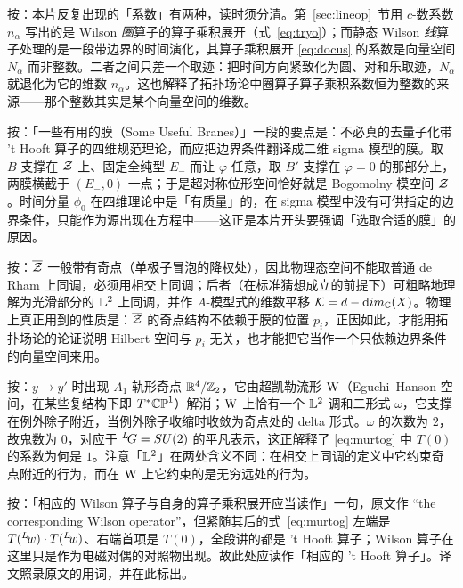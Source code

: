 \begin{yizhu}[易错点]
按：本片反复出现的「系数」有两种，读时须分清。第~\ref{sec:lineop}~节用 $c$-数系数 $n_\alpha$ 写出的是 Wilson {\it 圈}算子的算子乘积展开（式~\eqref{eq:tryo}）；而静态 Wilson {\it 线}算子处理的是一段带边界的时间演化，其算子乘积展开 \eqref{eq:docus} 的系数是向量空间 $N_\alpha$ 而非整数。二者之间只差一个取迹：把时间方向紧致化为圆、对和乐取迹，$N_\alpha$ 就退化为它的维数 $n_\alpha$。这也解释了拓扑场论中圈算子算子乘积系数恒为整数的来源——那个整数其实是某个向量空间的维数。
\end{yizhu}

\begin{yizhu}[物理图像]
按：「一些有用的膜（Some Useful Branes）」一段的要点是：不必真的去量子化带 't Hooft 算子的四维规范理论，而应把边界条件翻译成二维 sigma 模型的膜。取 $B$ 支撑在 $\EUZ$ 上、固定全纯型 $E_-$ 而让 $\varphi$ 任意，取 $B'$ 支撑在 $\varphi=0$ 的那部分上，两膜横截于 $(E_-,0)$ 一点；于是超对称位形空间恰好就是 Bogomolny 模空间 $\EUZ$。时间分量 $\phi_0$ 在四维理论中是「有质量」的，在 sigma 模型中没有可供指定的边界条件，只能作为源出现在方程中——这正是本片开头要强调「选取合适的膜」的原因。
\end{yizhu}

\begin{yizhu}[易错点]
按：$\bar\EUZ$ 一般带有奇点（单极子冒泡的降权处），因此物理态空间不能取普通 de Rham 上同调，必须用相交上同调；后者（在标准猜想成立的前提下）可粗略地理解为光滑部分的 ${\Bbb{L}}^2$ 上同调，并作 $A$-模型式的维数平移 $\EUK=d-{\rm dim}_{{\Bbb C}}(X)$。物理上真正用到的性质是：$\bar\EUZ$ 的奇点结构不依赖于膜的位置 $p_i$，正因如此，才能用拓扑场论的论证说明 Hilbert 空间与 $p_i$ 无关，也才能把它当作一个只依赖边界条件的向量空间来用。
\end{yizhu}

\begin{yizhu}[物理图像]
按：$y\to y'$ 时出现 $A_1$ 轨形奇点 $\Bbb{R}^4/\Bbb{Z}_2$，它由超凯勒流形 $\EUWW$（Eguchi--Hanson 空间，在某些复结构下即 $T^*\Bbb{CP}^1$）解消；$\EUWW$ 上恰有一个 ${\Bbb{L}}^2$ 调和二形式 $\omega$，它支撑在例外除子附近，当例外除子收缩时收敛为奇点处的 delta 形式。$\omega$ 的次数为 $2$，故鬼数为 $0$，对应于 $^L\negthinspace G=SU(2)$ 的平凡表示，这正解释了 \eqref{eq:murtog} 中 $T(0)$ 的系数为何是 $1$。注意「${\Bbb{L}}^2$」在两处含义不同：在相交上同调的定义中它约束奇点附近的行为，而在 $\EUWW$ 上它约束的是无穷远处的行为。
\end{yizhu}

\begin{yizhu}[原文疑误]
按：「相应的 Wilson 算子与自身的算子乘积展开应当读作」一句，原文作 “the corresponding Wilson operator”，但紧随其后的式~\eqref{eq:murtog} 左端是 $T({}^L\negthinspace w)\cdot T({}^L\negthinspace w)$、右端首项是 $T(0)$，全段讲的都是 't Hooft 算子；Wilson 算子在这里只是作为电磁对偶的对照物出现。故此处应读作「相应的 't Hooft 算子」。译文照录原文的用词，并在此标出。
\end{yizhu}

